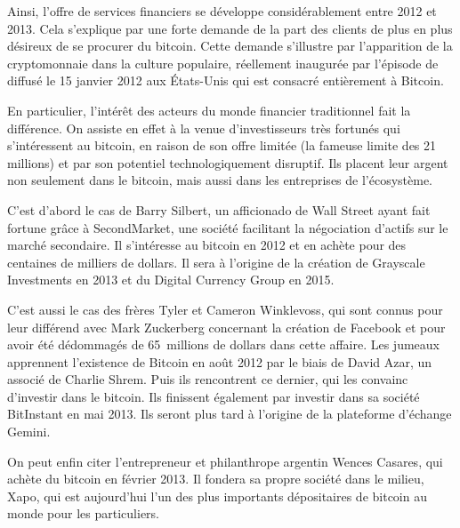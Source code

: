 Ainsi, l'offre de services financiers se développe considérablement entre 2012 et 2013. Cela s'explique par une forte demande de la part des clients de plus en plus désireux de se procurer du bitcoin. Cette demande s'illustre par l'apparition de la cryptomonnaie dans la culture populaire, réellement inaugurée par l'épisode de  diffusé le 15 janvier 2012 aux États-Unis qui est consacré entièrement à Bitcoin.


En particulier, l'intérêt des acteurs du monde financier traditionnel fait la différence. On assiste en effet à la venue d'investisseurs très fortunés qui s'intéressent au bitcoin, en raison de son offre limitée (la fameuse limite des 21 millions) et par son potentiel technologiquement disruptif. Ils placent leur argent non seulement dans le bitcoin, mais aussi dans les entreprises de l'écosystème.

C'est d'abord le cas de Barry Silbert, un afficionado de Wall Street ayant fait fortune grâce à SecondMarket, une société facilitant la négociation d'actifs sur le marché secondaire. Il s'intéresse au bitcoin en 2012 et en achète pour des centaines de milliers de dollars. Il sera à l'origine de la création de Grayscale Investments en 2013 et du Digital Currency Group en 2015.

C'est aussi le cas des frères Tyler et Cameron Winklevoss, qui sont connus pour leur différend avec Mark Zuckerberg concernant la création de Facebook et pour avoir été dédommagés de 65~millions de dollars dans cette affaire. Les jumeaux apprennent l'existence de Bitcoin en août 2012 par le biais de David Azar, un associé de Charlie Shrem. Puis ils rencontrent ce dernier, qui les convainc d'investir dans le bitcoin. Ils finissent également par investir dans sa société BitInstant en mai 2013. Ils seront plus tard à l'origine de la plateforme d'échange Gemini.

On peut enfin citer l'entrepreneur et philanthrope argentin Wences Casares, qui achète du bitcoin en février 2013. Il fondera sa propre société dans le milieu, Xapo, qui est aujourd'hui l'un des plus importants dépositaires de bitcoin au monde pour les particuliers.

